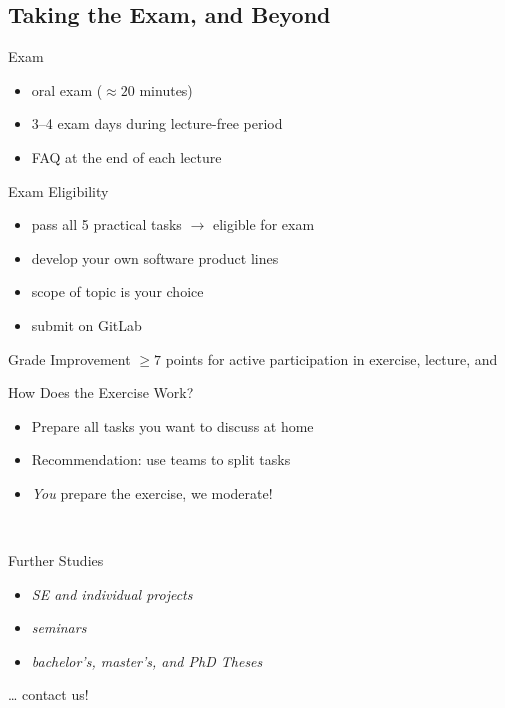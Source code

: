 


\subsection{Taking the Exam, and Beyond}

\begin{frame}{\myframetitle}
	\begin{mycolumns}
		\begin{definition}{Exam}
			\begin{itemize}
				\item oral exam ($\approx 20$ minutes)
				\item 3--4 exam days during lecture-free period
				\item FAQ at the end of each lecture
			\end{itemize}
		\end{definition}
		\begin{definition}{Exam Eligibility }
			\begin{itemize}
				\item pass all 5 practical tasks $\rightarrow$ eligible for exam
				\item develop your own software product lines
				\item scope of topic is your choice
				\item submit on GitLab
			\end{itemize}
		\end{definition}
		\begin{definition}{Grade Improvement }
			$\geq 7$ points for active participation in exercise, lecture, and \ulmMoodle
		\end{definition}
	\mynextcolumn
		\begin{note}{How Does the Exercise Work?}
			\begin{itemize}
				\item Prepare all tasks you want to discuss at home
				\item Recommendation: use teams to split tasks
				\item \emph{You} prepare the exercise, we moderate!
			\end{itemize}
		\end{note}

		~

		\begin{note}{Further Studies}
			\begin{itemize}
				\item \emph{SE and individual projects}
				\item \emph{seminars}
				\item \emph{bachelor's, master's, and PhD Theses}
			\end{itemize}
			\ldots{} contact us!
		\end{note}
	\end{mycolumns}
\end{frame}